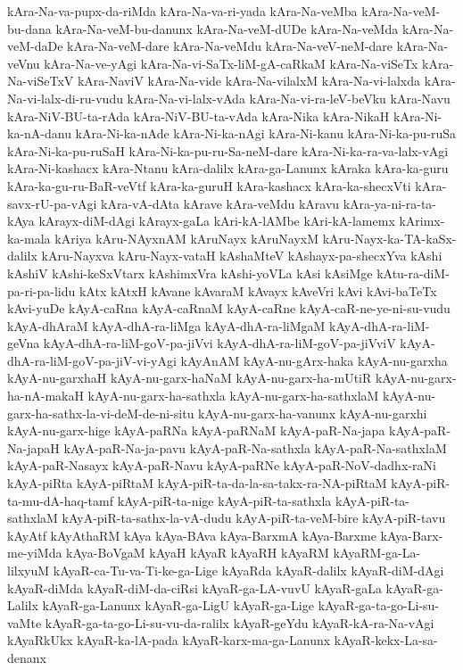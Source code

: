 {kAra-Na-va-pupx-da-riMda
kAra-Na-va-ri-yada
kAra-Na-veMba
kAra-Na-veM-bu-dana
kAra-Na-veM-bu-danunx
kAra-Na-veM-dUDe
kAra-Na-veMda
kAra-Na-veM-daDe
kAra-Na-veM-dare
kAra-Na-veMdu
kAra-Na-veV-neM-dare
kAra-Na-veVnu
kAra-Na-ve-yAgi
kAra-Na-vi-SaTx-liM-gA-caRkaM
kAra-Na-viSeTx
kAra-Na-viSeTxV
kAra-NaviV
kAra-Na-vide
kAra-Na-vilalxM
kAra-Na-vi-lalxda
kAra-Na-vi-lalx-di-ru-vudu
kAra-Na-vi-lalx-vAda
kAra-Na-vi-ra-leV-beVku
kAra-Navu
kAra-NiV-BU-ta-rAda
kAra-NiV-BU-ta-vAda
kAra-Nika
kAra-NikaH
kAra-Ni-ka-nA-danu
kAra-Ni-ka-nAde
kAra-Ni-ka-nAgi
kAra-Ni-kanu
kAra-Ni-ka-pu-ruSa
kAra-Ni-ka-pu-ruSaH
kAra-Ni-ka-pu-ru-Sa-neM-dare
kAra-Ni-ka-ra-va-lalx-vAgi
kAra-Ni-kashacx
kAra-Ntanu
kAra-dalilx
kAra-ga-Lanunx
kAraka
kAra-ka-guru
kAra-ka-gu-ru-BaR-veVtf
kAra-ka-guruH
kAra-kashacx
kAra-ka-shecxVti
kAra-savx-rU-pa-vAgi
kAra-vA-dAta
kArave
kAra-veMdu
kAravu
kAra-ya-ni-ra-ta-kAya
kArayx-diM-dAgi
kArayx-gaLa
kAri-kA-lAMbe
kAri-kA-lamemx
kArimx-ka-mala
kAriya
kAru-NAyxnAM
kAruNayx
kAruNayxM
kAru-Nayx-ka-TA-kaSx-dalilx
kAru-Nayxva
kAru-Nayx-vataH
kAshaMteV
kAshayx-pa-shecxYva
kAshi
kAshiV
kAshi-keSxVtarx
kAshimxVra
kAshi-yoVLa
kAsi
kAsiMge
kAtu-ra-diM-pa-ri-pa-lidu
kAtx
kAtxH
kAvane
kAvaraM
kAvayx
kAveVri
kAvi
kAvi-baTeTx
kAvi-yuDe
kAyA-caRna
kAyA-caRnaM
kAyA-caRne
kAyA-caR-ne-ye-ni-su-vudu
kAyA-dhAraM
kAyA-dhA-ra-liMga
kAyA-dhA-ra-liMgaM
kAyA-dhA-ra-liM-geVna
kAyA-dhA-ra-liM-goV-pa-jiVvi
kAyA-dhA-ra-liM-goV-pa-jiVviV
kAyA-dhA-ra-liM-goV-pa-jiV-vi-yAgi
kAyAnAM
kAyA-nu-gArx-haka
kAyA-nu-garxha
kAyA-nu-garxhaH
kAyA-nu-garx-haNaM
kAyA-nu-garx-ha-mUtiR
kAyA-nu-garx-ha-nA-makaH
kAyA-nu-garx-ha-sathxla
kAyA-nu-garx-ha-sathxlaM
kAyA-nu-garx-ha-sathx-la-vi-deM-de-ni-situ
kAyA-nu-garx-ha-vanunx
kAyA-nu-garxhi
kAyA-nu-garx-hige
kAyA-paRNa
kAyA-paRNaM
kAyA-paR-Na-japa
kAyA-paR-Na-japaH
kAyA-paR-Na-ja-pavu
kAyA-paR-Na-sathxla
kAyA-paR-Na-sathxlaM
kAyA-paR-Nasayx
kAyA-paR-Navu
kAyA-paRNe
kAyA-paR-NoV-dadhx-raNi
kAyA-piRta
kAyA-piRtaM
kAyA-piR-ta-da-la-sa-takx-ra-NA-piRtaM
kAyA-piR-ta-mu-dA-haq-tamf
kAyA-piR-ta-nige
kAyA-piR-ta-sathxla
kAyA-piR-ta-sathxlaM
kAyA-piR-ta-sathx-la-vA-dudu
kAyA-piR-ta-veM-bire
kAyA-piR-tavu
kAyAtf
kAyAthaRM
kAya
kAya-BAva
kAya-BarxmA
kAya-Barxme
kAya-Barx-me-yiMda
kAya-BoVgaM
kAyaH
kAyaR
kAyaRH
kAyaRM
kAyaRM-ga-La-lilxyuM
kAyaR-ca-Tu-va-Ti-ke-ga-Lige
kAyaRda
kAyaR-dalilx
kAyaR-diM-dAgi
kAyaR-diMda
kAyaR-diM-da-ciRsi
kAyaR-ga-LA-vuvU
kAyaR-gaLa
kAyaR-ga-Lalilx
kAyaR-ga-Lanunx
kAyaR-ga-LigU
kAyaR-ga-Lige
kAyaR-ga-ta-go-Li-su-vaMte
kAyaR-ga-ta-go-Li-su-vu-da-ralilx
kAyaR-geYdu
kAyaR-kA-ra-Na-vAgi
kAyaRkUkx
kAyaR-ka-lA-pada
kAyaR-karx-ma-ga-Lanunx
kAyaR-kekx-La-sa-denanx
}
